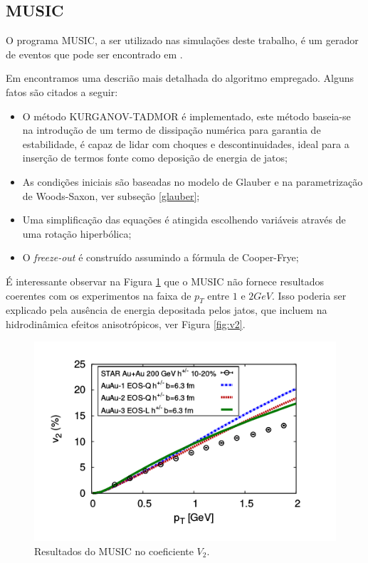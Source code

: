 \subsection{MUSIC}

O programa MUSIC, a ser utilizado nas simulações deste trabalho, é um
gerador de eventos que pode ser encontrado em \cite{noauthor_music_nodate}.
\par
Em \cite{schenke_3+1d_2010} encontramos uma descrião mais detalhada do algoritmo empregado. Alguns fatos
são citados a seguir:

\begin{itemize}
 \item O método KURGANOV-TADMOR é implementado, este método baseia-se na introdução de
 um termo de dissipação numérica para garantia de estabilidade, é capaz de lidar com
 choques e descontinuidades, ideal para a inserção de termos fonte como deposição de energia
 de jatos;
 \item As condições iniciais são baseadas no modelo de Glauber e na parametrização de Woods-Saxon,
 ver subseção \ref{glauber};
 \item Uma simplificação das equações é atingida escolhendo variáveis através de uma rotação hiperbólica;
 \item O {\it freeze-out} é construído assumindo a fórmula de Cooper-Frye\cite{teaney_chemical_2002};
\end{itemize}

É interessante observar na Figura \ref{fig:musicv2} que o MUSIC não fornece resultados coerentes com os experimentos na faixa de $p_T$
entre $1$ e $2 GeV$. Isso poderia ser explicado pela ausência de energia depositada pelos jatos, que incluem na hidrodinâmica efeitos
anisotrópicos\cite{andrade_jet_2014}, ver Figura \ref{fig:v2}.

\begin{figure}[!h]
\centering
 \includegraphics[scale=0.5]{Metodos/music_results.png}
 \caption{Resultados do MUSIC no coeficiente $V_{2}$.}
 \label{fig:musicv2}
\end{figure}

